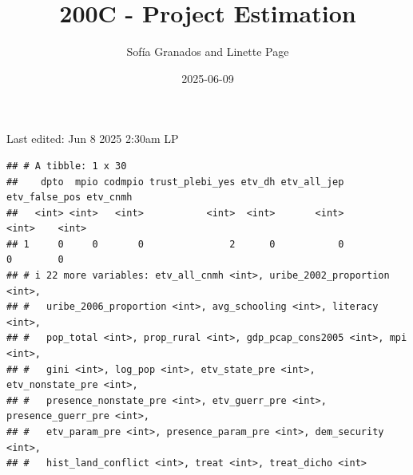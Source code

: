 \documentclass[
]{article}
\title{200C - Project Estimation}
\author{Sofía Granados and Linette Page}
\date{2025-06-09}
\newenvironment{Shaded}{\begin{snugshade}}{\end{snugshade}}
\newcommand{\AlertTok}[1]{\textcolor[rgb]{0.94,0.16,0.16}{#1}}
\newcommand{\AttributeTok}[1]{\textcolor[rgb]{0.13,0.29,0.53}{#1}}
\newcommand{\CommentTok}[1]{\textcolor[rgb]{0.56,0.35,0.01}{\textit{#1}}}
\newcommand{\DecValTok}[1]{\textcolor[rgb]{0.00,0.00,0.81}{#1}}
\newcommand{\FunctionTok}[1]{\textcolor[rgb]{0.13,0.29,0.53}{\textbf{#1}}}
\newcommand{\NormalTok}[1]{#1}
\newcommand{\OtherTok}[1]{\textcolor[rgb]{0.56,0.35,0.01}{#1}}
\newcommand{\SpecialCharTok}[1]{\textcolor[rgb]{0.81,0.36,0.00}{\textbf{#1}}}
\begin{document}
\maketitle

Last edited: Jun 8 2025 2:30am LP

\begin{Shaded}
\end{Shaded}

\begin{verbatim}
## # A tibble: 1 x 30
##    dpto  mpio codmpio trust_plebi_yes etv_dh etv_all_jep etv_false_pos etv_cnmh
##   <int> <int>   <int>           <int>  <int>       <int>         <int>    <int>
## 1     0     0       0               2      0           0             0        0
## # i 22 more variables: etv_all_cnmh <int>, uribe_2002_proportion <int>,
## #   uribe_2006_proportion <int>, avg_schooling <int>, literacy <int>,
## #   pop_total <int>, prop_rural <int>, gdp_pcap_cons2005 <int>, mpi <int>,
## #   gini <int>, log_pop <int>, etv_state_pre <int>, etv_nonstate_pre <int>,
## #   presence_nonstate_pre <int>, etv_guerr_pre <int>, presence_guerr_pre <int>,
## #   etv_param_pre <int>, presence_param_pre <int>, dem_security <int>,
## #   hist_land_conflict <int>, treat <int>, treat_dicho <int>
\end{verbatim}
\end{document}
